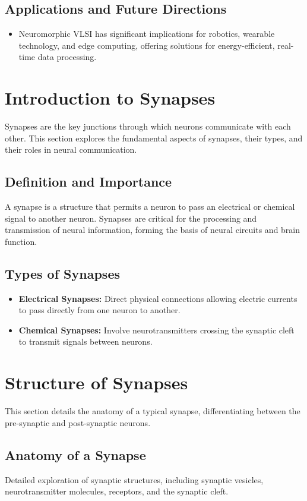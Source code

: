 \documentclass{article}
\begin{document}
\subsection{Applications and Future Directions}
\begin{itemize}
    \item Neuromorphic VLSI has significant implications for robotics, wearable technology, and edge computing, offering solutions for energy-efficient, real-time data processing.
\end{itemize}


\section{Introduction to Synapses}
Synapses are the key junctions through which neurons communicate with each other. This section explores the fundamental aspects of synapses, their types, and their roles in neural communication.

\subsection{Definition and Importance}
A synapse is a structure that permits a neuron to pass an electrical or chemical signal to another neuron. Synapses are critical for the processing and transmission of neural information, forming the basis of neural circuits and brain function.

\subsection{Types of Synapses}
\begin{itemize}
    \item \textbf{Electrical Synapses:} Direct physical connections allowing electric currents to pass directly from one neuron to another.
    \item \textbf{Chemical Synapses:} Involve neurotransmitters crossing the synaptic cleft to transmit signals between neurons.
\end{itemize}

\section{Structure of Synapses}
This section details the anatomy of a typical synapse, differentiating between the pre-synaptic and post-synaptic neurons.

\subsection{Anatomy of a Synapse}
Detailed exploration of synaptic structures, including synaptic vesicles, neurotransmitter molecules, receptors, and the synaptic cleft.
\end{document}
